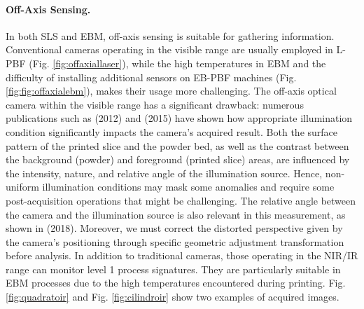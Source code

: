 \paragraph{Off-Axis Sensing.} In both SLS and EBM, off-axis sensing is suitable for gathering information. Conventional cameras operating in the visible range are usually employed in L-PBF (Fig. \ref{fig:offaxiallaser}), while the high temperatures in EBM and the difficulty of installing additional sensors on EB-PBF machines (Fig. \ref{fig:fig:offaxialebm}), makes their usage more challenging. The off-axis optical camera within the visible range has a significant drawback: numerous publications such as \citealt{kleszczynski_error_2012} (2012) and \citeauthor{foster_bk_optical_2015} (2015) have shown how appropriate illumination condition significantly impacts the camera's acquired result. Both the surface pattern of the printed slice and the powder bed, as well as the contrast between the background (powder) and foreground (printed slice) areas, are influenced by the intensity, nature, and relative angle of the illumination source. Hence, non-uniform illumination conditions may mask some anomalies and require some post-acquisition operations that might be challenging. The relative angle between the camera and the illumination source is also relevant in this measurement, as shown in  \citeauthor{caltanissetta_characterization_2018} (2018). Moreover, we must correct the distorted perspective given by the camera's positioning through specific geometric adjustment transformation before analysis. In addition to traditional cameras, those operating in the NIR/IR range can monitor level 1 process signatures. They are particularly suitable in EBM processes due to the high temperatures encountered during printing. Fig. \ref{fig:quadratoir} and Fig. \ref{fig:cilindroir} show two examples of acquired images. 
